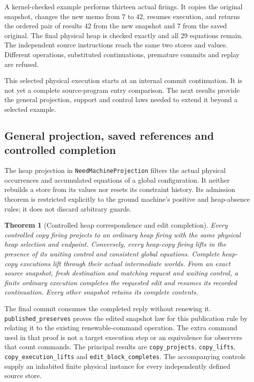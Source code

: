 \documentclass[11pt]{article}
\newtheorem{theorem}{Theorem}
\newcommand{\code}[1]{\texttt{\small #1}}
\begin{document}
A kernel-checked example performs thirteen actual firings. It copies the
original snapshot, changes the new memo from 7 to 42, resumes execution,
and returns the ordered pair of results 42 from the new snapshot and 7
from the saved original. The final physical heap is checked exactly and all
29 equations remain. The independent source instructions reach the same
two stores and values. Different operations, substituted continuations,
premature commits and replay are refused.

This selected physical execution starts at an internal commit continuation.
It is not yet a complete source-program entry comparison. The next results
provide the general projection, support and control laws needed to extend
it beyond a selected example.

\subsection{General projection, saved references and controlled completion}

The heap projection in \code{NeedMachineProjection} filters the actual
physical occurrences and accumulated equations of a global configuration.
It neither rebuilds a store from its values nor resets its constraint history.
Its admission theorem is restricted explicitly to the ground machine's
positive and heap-absence rules; it does not discard arbitrary guards.

\begin{theorem}[Controlled heap correspondence and edit completion]
Every controlled copy firing projects to an ordinary heap firing with the
same physical heap selection and endpoint. Conversely, every heap-copy
firing lifts in the presence of its waiting control and consistent global
equations. Complete heap-copy executions lift through their actual
intermediate worlds. From an exact source snapshot, fresh destination and
matching request and waiting control, a finite ordinary execution completes
the requested edit and resumes its recorded continuation. Every other
snapshot retains its complete contents.
\end{theorem}
The final commit consumes the completed reply without renewing it.
\code{published\_preserves} proves the edited snapshot law for this
publication rule by relating it to the existing renewable-command
operation. The extra command used in that proof is not a target execution
step or an equivalence for observers that count commands.
The principal results are \code{copy\_projects}, \code{copy\_lifts},
\code{copy\_execution\_lifts} and \code{edit\_block\_completes}.
The accompanying controls supply an inhabited finite physical instance
for every independently defined source store.
\end{document}
